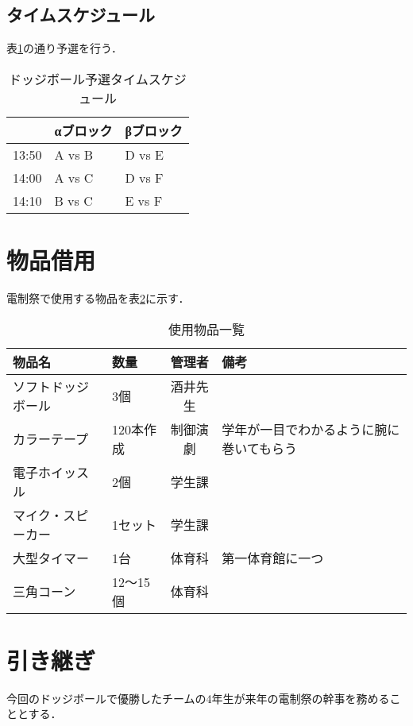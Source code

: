 \documentclass[dvipdfmx]{jsarticle}
\begin{document}
\subsection{タイムスケジュール}
表\ref{block}の通り予選を行う．
\begin{table}[H]
  \caption{ドッジボール予選タイムスケジュール}
  \label{block}
  \centering
  \begin{tabular}{l|ll}
          & αブロック  & βブロック  \\\hline\hline
    13:50 & A vs B & D vs E \\
    14:00 & A vs C & D vs F \\
    14:10 & B vs C & E vs F
  \end{tabular}
\end{table}

\section{物品借用}
電制祭で使用する物品を表\ref{buppin}に示す．
\begin{table}[H]
  \caption{使用物品一覧}
  \label{buppin}
  \centering
  \begin{tabular}{l|lcl}
    物品名       & 数量     & 管理者  & 備考                   \\\hline\hline
    ソフトドッジボール & 3個     & 酒井先生 &                      \\
    カラーテープ    & 120本作成 & 制御演劇 & 学年が一目でわかるように腕に巻いてもらう \\
    電子ホイッスル   & 2個     & 学生課  &                      \\
    マイク・スピーカー & 1セット   & 学生課  &                      \\
    大型タイマー    & 1台     & 体育科  & 第一体育館に一つ             \\
    三角コーン     & 12～15個 & 体育科  &
  \end{tabular}
\end{table}

\section{引き継ぎ}
今回のドッジボールで優勝したチームの4年生が来年の電制祭の幹事を務めることとする．
\end{document}
